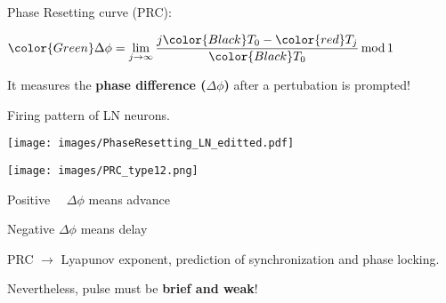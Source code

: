 \usualsep\usualsep
\begin{minipage}{0.2\textwidth}
  \begin{center}
    
    
    \usualsep
    
    \usualsep
    
    \usualsep\usualsep\usualsep
    {\color{blue}
     Phase Resetting curve (PRC):
    
    \vspace{0.3cm} 
    $ {\color{Green} \Delta \phi} = \lim\limits_{j\to\infty} \dfrac{j
      {\color{Black} T_0} - {\color{red} T_j}}{ {\color{Black} T_0} }
    \, \mbox{mod} \, 1 $
    }
    
    \usualsep\usualsep 
     It measures the {\bf \color{Green}
      phase difference ($\Delta \phi$)} after a pertubation is
    prompted!
  \end{center}
	
\end{minipage}
\begin{minipage}{0.25\textwidth}
  \begin{flushright}
     Firing pattern of LN neurons.
  \end{flushright}
  
  \texttt{[image: images/PhaseResetting\_LN\_editted.pdf]}
\end{minipage}



\usualsep\usualsep
\begin{minipage}{0.22\textwidth}
    \texttt{[image: images/PRC\_type12.png]}
\end{minipage}
\begin{minipage}{0.26\textwidth}
  
   Positive \ \ $\Delta \phi$ means advance 
  
   Negative $\Delta \phi$ means delay
  
  \usualsep
   PRC {\color{Green} $\rightarrow$} Lyapunov exponent,
  prediction of synchronization and phase locking.
  
  \usualsep\usualsep
   Nevertheless, pulse must be {\bf \color{red} brief and weak}!
  
\end{minipage}


